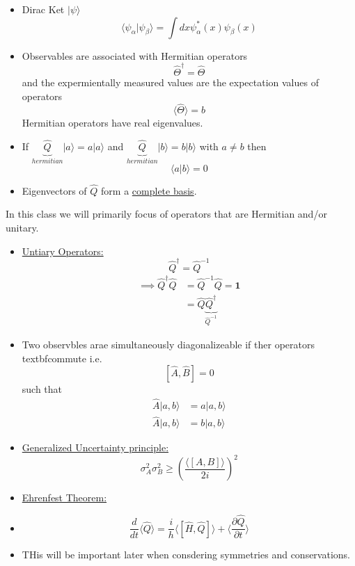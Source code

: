 \documentclass{article}
\newcommand{\ket}[1]{|#1 \rangle}
\newcommand{\inner}[2]{\langle #1 | #2 \rangle}
\newcommand{\mean}[1]{\langle #1 \rangle}
\begin{document}
\begin{itemize}
  \item Dirac Ket $\ket{\psi}$
  \[ \inner{\psi_{\alpha}}{\psi_{\beta}} = \int dx \psi_{\alpha}^{*}(x) \psi_{\beta}(x) \]

  \item Observables are associated with Hermitian operators 
  \[ \hat{\Theta}^{\dagger} = \hat{\Theta} \]
  and the expermientally measured values are the expectation values of operators\[ \mean{\hat{\Theta}} = b \] Hermitian operators have real eigenvalues.

  \item If $\underbrace{\hat{Q}}_{hermitian} \ket{a} = a \ket{a}$ and $\underbrace{\hat{Q}}_{hermitian} \ket{b} = b \ket{b}$ with $a \neq b$ then 
  \[ \inner{a}{b} = 0 \]
  
  \item Eigenvectors of $\hat{Q}$ form a \underline{complete basis}.
\end{itemize}

\vskip 0.5cm
In this class we will primarily focus of operators that are Hermitian and/or unitary.

\begin{itemize}
  \item \underline{Untiary Operators:} 
  \[ \hat{Q}^{\dagger} = \hat{Q}^{-1} \]
  \begin{align*}
    \implies \hat{Q}^{\dagger}\hat{Q} &= \hat{Q}^{-1}\hat{Q} = \mathbf{1}\\
                                      &= \hat{Q}\underbrace{\hat{Q}^{\dagger}}_{\hat{Q}^{-1}}
  \end{align*}

  \item Two observbles arae simultaneously diagonalizeable if ther operators textbf{commute} i.e. 
  \[ [\hat{A}, \hat{B}] = 0 \]
  such that 
  \begin{align*}
    \hat{A} \ket{a, b} &= a \ket{a,b } \\
    \hat{A} \ket{a, b} &= b \ket{a,b } 
  \end{align*}

  \item \underline{Generalized Uncertainty principle:} 
  \[ \sigma_A^2 \sigma_B^2 \geq \left( \frac{\mean{[A, B]}}{2i} \right)^2\]

  \item \underline{Ehrenfest Theorem:} 
  \item \[ \frac{d}{dt} \mean{\hat{Q}} = \frac{i}{h} \mean{[\hat{H}, \hat{Q}]} + \mean{\frac{\partial \hat{Q}}{\partial t}} \]
  \item THis will be important later when consdering symmetries and conservations.
\end{itemize}
\end{document}
